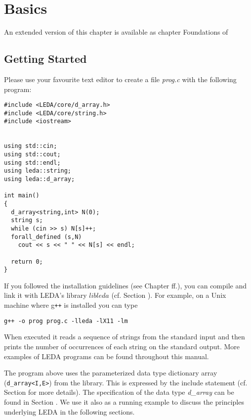 \chapter{Basics}
\label{Basics}

\noindent
{\small An extended version of this chapter is available as chapter Foundations
of \cite{LEDAbook}}

\section{Getting Started}

\label{A First Example}
Please use your favourite text editor to create a file {\em prog.c} with the
following program:

\begin{verbatim}
#include <LEDA/core/d_array.h>
#include <LEDA/core/string.h>
#include <iostream>


using std::cin;
using std::cout;
using std::endl;
using leda::string;
using leda::d_array;

int main()
{
  d_array<string,int> N(0);
  string s;
  while (cin >> s) N[s]++;
  forall_defined (s,N) 
    cout << s << " " << N[s] << endl;

  return 0;
}
\end{verbatim}

\noindent
If you followed the installation guidelines (see Chapter
 ff.),
you can compile and link it with LEDA's library $\mathit{libleda}$
(cf. Section ).  For example, on a Unix machine where g{\tt ++}
is installed you can type

\begin{verbatim}
g++ -o prog prog.c -lleda -lX11 -lm
\end{verbatim}

When executed it reads a sequence of strings from the standard input and then 
prints the number of occurrences of each string on the standard output. More 
examples of LEDA programs can be found throughout this manual.


The program above uses the parameterized data type dictionary array 
(\texttt{d\_array<I,E>}) from the library. This is expressed by the include
statement (cf. Section  for more details). The specification
of the data type {\it d\_array} can be found in Section 
.  We use it also as a running example to discuss the
principles underlying LEDA in the following sections.



